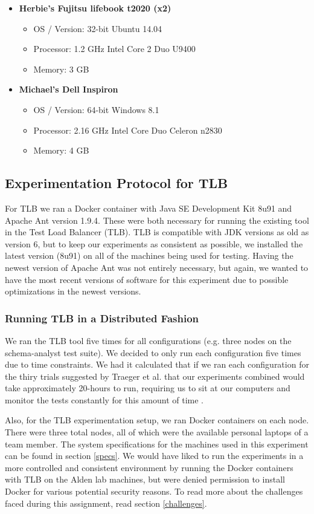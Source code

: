 \documentclass{article}
\begin{document}
{\begin{itemize}
\item \textbf{Herbie's Fujitsu lifebook t2020 (x2)}
\begin{itemize}
    \item OS / Version: 32-bit Ubuntu 14.04
    \item Processor: 1.2 GHz Intel Core 2 Duo U9400
    \item Memory: 3 GB
\end{itemize}
\item \textbf{Michael's Dell Inspiron}
\begin{itemize}
    \item OS / Version: 64-bit Windows 8.1
    \item Processor: 2.16 GHz Intel Core Duo Celeron n2830
    \item Memory: 4 GB
\end{itemize}
\end{itemize}

\subsection{Experimentation Protocol for TLB}
For TLB we ran a Docker container with Java SE Development Kit 8u91 and Apache Ant version 1.9.4. These were both necessary
for running the existing tool in the Test Load Balancer (TLB). TLB is compatible with JDK versions as old as version 6, but
to keep our experiments as consistent as possible, we installed the latest version (8u91) on all of the machines being used for
testing. Having the newest version of Apache Ant was not entirely necessary, but again, we wanted to have the most
recent versions of software for this experiment due to possible optimizations in the newest versions.

\subsubsection{Running TLB in a Distributed Fashion}
We ran the TLB tool five times for all configurations (e.g. three nodes on the schema-analyst test suite). We decided
to only run each configuration five times due to time constraints. We had it calculated that if we ran each configuration
for the thiry trials suggested by Traeger et al. that our experiments combined would take approximately 20-hours
to run, requiring us to sit at our computers and monitor the tests constantly for this amount of time \cite{traeger2008nine}.

Also, for the TLB experimentation setup, we ran Docker containers on each node. There were three total nodes, all of which
were the available personal laptops of a team member. The system specifications for the machines used in this experiment
can be found in section \ref{specs}. We would have liked to run the experiments in a more controlled and consistent environment
by running the Docker containers with TLB on the Alden lab machines, but were denied permission to install Docker for various
potential security reasons. To read more about the challenges faced during this assignment, read section \ref{challenges}.

}
\end{document}
